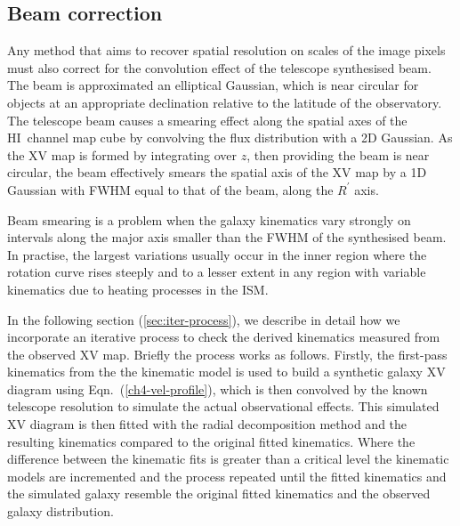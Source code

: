 \documentclass[traditabstract]{aa} %
\newcommand\HI{H{\small I}}
\begin{document}
\subsection{Beam correction}
\label{sec:beam-corr}

Any method that aims to recover spatial resolution on scales of the
image pixels must also correct for the convolution effect of the 
telescope synthesised beam. The beam is approximated an
elliptical Gaussian, which is near circular for objects at an appropriate 
declination relative to the
latitude of the observatory. The telescope
beam causes a smearing effect along the spatial axes of the \HI\
channel map cube by convolving the flux distribution with a 2D
Gaussian. As the XV map is formed by integrating over $z$, then
providing the beam is near circular, the beam effectively smears the
spatial axis of the XV map by a 1D Gaussian with FWHM equal to that
of the beam, along the $R^{\prime}$ axis.

Beam smearing is a problem when the galaxy kinematics vary strongly on
intervals along the major axis smaller than the FWHM of the
synthesised beam. In practise, the largest variations usually 
occur in the inner region where the rotation curve rises steeply
and to a lesser extent in any region with 
variable kinematics due to heating processes in the ISM.

In the following section (\ref{sec:iter-process}), we describe
in detail how we incorporate an iterative process to check the derived
kinematics measured from the observed XV map. Briefly the process works
as follows. Firstly, the first-pass kinematics from the  the kinematic
model is used to build a synthetic galaxy XV diagram using
Eqn.~(\ref{ch4-vel-profile}), which is then convolved by
the known telescope resolution to simulate the actual observational
effects. This simulated XV diagram is then fitted with the radial decomposition
method and the resulting kinematics compared to the original fitted
kinematics. Where the difference between the kinematic fits is greater
than a critical level the kinematic models are incremented and the
process repeated until the fitted kinematics and the simulated galaxy
resemble the original fitted kinematics and the observed galaxy
distribution.
\end{document}
